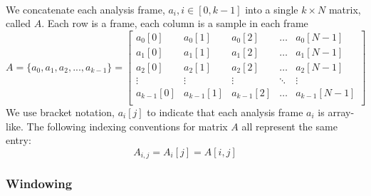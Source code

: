 \documentclass[12pt,letterpaper]{article}
\begin{document}
\paragraph*{}We concatenate each analysis frame, $a_{i}, i \in [0,k-1]$ into a single $k \times N$ matrix, called $A$. Each row is a frame, each column is a sample in each frame
\begin{equation}
\label{eqn-FrameMatrix}
A = \big\{ a_{0} , a_{1} , a_{2} , ... , a_{k-1} \big\} = 
\begin{bmatrix}
a_{0}[0] & a_{0}[1] & a_{0}[2] & \hdots & a_{0}[N-1] \\
a_{1}[0] & a_{1}[1] & a_{1}[2] & \hdots & a_{1}[N-1] \\
a_{2}[0] & a_{2}[1] & a_{2}[2] & \hdots & a_{2}[N-1] \\
\vdots 		& \vdots 	  & \vdots 		& \ddots & \vdots        \\
a_{k-1}[0] & a_{k-1}[1] & a_{k-1}[2] & \hdots & a_{k-1}[N-1] \\
\end{bmatrix}
\end{equation}
We use bracket notation, $a_i[j]$ to indicate that each analysis frame $a_i$ is array-like. The following indexing conventions for matrix $A$ all represent the same entry:
\begin{equation}
\label{eqn-IndexingA}
A_{i,j} = A_i[j] = A[i,j]
\end{equation}


\subsubsection{Windowing}
\label{subsubsec-Windowing}
\end{document}
